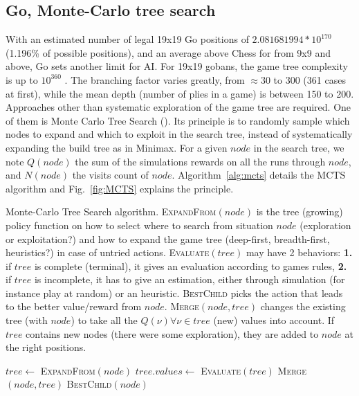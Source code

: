 \subsection{Go, Monte-Carlo tree search}
With an estimated number of legal 19x19 Go positions of $2.081681994 * 10^{170}$ \citep{tromp2006} (1.196\% of possible positions), and an average  above Chess for  from 9x9 and above, Go sets another limit for AI. For 19x19 gobans, the game tree complexity is up to $10^{360}$ \citep{allis1994}. The branching factor varies greatly, from $\approx 30$ to $300$ (361 cases at first), while the mean depth (number of plies in a game) is between 150 to 200. Approaches other than systematic exploration of the game tree are required. One of them is Monte Carlo Tree Search (). Its principle is to randomly sample which nodes to expand and which to exploit in the search tree, instead of systematically expanding the build tree as in Minimax. For a given $node$ in the search tree, we note $Q(node)$ the sum of the simulations rewards on all the runs through $node$, and $N(node)$ the visits count of $node$. Algorithm~\ref{alg:mcts} details the MCTS algorithm and Fig.~\ref{fig:MCTS} explains the principle.

\begin{algorithm}
\caption{Monte-Carlo Tree Search algorithm. 
\textsc{ExpandFrom}$(node)$ is the tree (growing) policy function on how to select where to search from situation $node$ (exploration or exploitation?) and how to expand the game tree (deep-first, breadth-first, heuristics?) in case of untried actions. \textsc{Evaluate}$(tree)$ may have 2 behaviors: \textbf{1.} if $tree$ is complete (terminal), it gives an evaluation according to games rules, \textbf{2.} if $tree$ is incomplete, it has to give an estimation, either through simulation (for instance play at random) or an heuristic. \textsc{BestChild} picks the action that leads to the better value/reward from $node$. \textsc{Merge}$(node, tree)$ changes the existing tree (with $node$) to take all the $Q(\nu) \forall \nu \in tree$ (new) values into account. If $tree$ contains new nodes (there were some exploration), they are added to $node$ at the right positions.}
\label{alg:mcts}
\begin{algorithmic}
        \State $tree \gets$ \textsc{ExpandFrom}$(node)$
        \State $tree.values \gets$ \textsc{Evaluate}$(tree)$
        \State \textsc{Merge}$(node, tree)$
    \EndWhile
    \State \Return \textsc{BestChild}$(node)$
\EndFunction
\end{algorithmic}
\end{algorithm}


